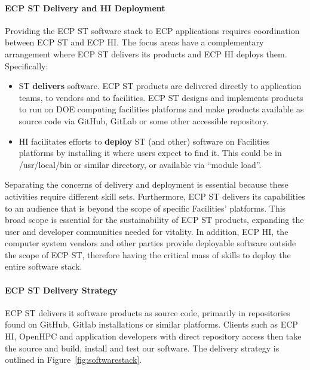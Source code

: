 \paragraph{ECP ST Delivery and HI Deployment}
Providing the ECP ST software stack to ECP applications requires coordination between ECP ST and ECP HI. The focus areas have a complementary arrangement where ECP ST delivers its products and ECP HI deploys them. Specifically:
\begin{itemize}
	\item ST \textbf{delivers} software.  ECP ST products are delivered directly to application teams, to vendors and to facilities.  ECP ST designs and implements products to run on DOE computing facilities platforms and make products available as source code via GitHub, GitLab or some other accessible repository.
	\item HI facilitates efforts to \textbf{deploy} ST (and other) software on Facilities platforms by installing it where users expect to find it. This could be in /usr/local/bin or similar directory, or available via “module load”.
\end{itemize}
Separating the concerns of delivery and deployment is essential because these activities require different skill sets. Furthermore, ECP ST delivers its capabilities to an audience that is beyond the scope of specific Facilities’ platforms. This broad scope is essential for the sustainability of ECP ST products, expanding the user and developer communities needed for vitality. In addition, ECP HI, the computer system vendors and other parties provide deployable software outside the scope of ECP ST, therefore having the critical mass of skills to deploy the entire software stack.

\paragraph{ECP ST Delivery Strategy}
ECP ST delivers it software products as source code, primarily in repositories found on GitHub, Gitlab installations or similar platforms. Clients such as ECP HI, OpenHPC and application developers with direct repository access then take the source and build, install and test our software. The delivery strategy is outlined in Figure~\ref{fig:softwarestack}.  


